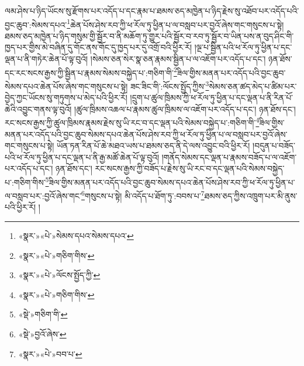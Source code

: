 ལམ་ཤེས་པ་ཉིད་ཡོངས་སུ་རྫོགས་པར་འདོད་པ་དང་རྣམ་པ་ཐམས་ཅད་མཁྱེན་པ་ཉིད་རྗེས་སུ་འཐོབ་པར་འདོད་པའི་བྱང་ཆུབ་:སེམས་དཔའ་\footnote{«སྣར་»«པེ་»སེམས་དཔའ་སེམས་དཔའ་}ཆེན་པོས་ཤེས་རབ་ཀྱི་ཕ་རོལ་ཏུ་ཕྱིན་པ་ལ་བསླབ་པར་བྱའོ་ཞེས་གང་གསུངས་པ་སྟེ། ཐམས་ཅད་མཁྱེན་པ་ཉིད་གསུམ་གྱི་སྦྱོར་བ་ནི་མཆོག་ཏུ་གྱུར་པའི་སྦྱོར་བ་རབ་ཏུ་སྦྱོར་བ་ཡིན་པས་ན་བུད་ཤིང་གི་ཁྱད་པར་གྱིས་མེ་བཞིན་དུ་གོང་ནས་གོང་དུ་ཁྱད་པར་དུ་འགྲོ་བའི་ཕྱིར་རོ། །ལྔ་པ་སྦྱིན་པའི་ཕ་རོལ་ཏུ་ཕྱིན་པ་དང་ལྡན་པ་ནི་གཏེར་ཆེན་པོ་ལྟ་བུའོ། །སེམས་ཅན་སེར་སྣ་ཅན་རྣམས་སྦྱིན་པ་ལ་འཇོག་པར་འདོད་པ་དང་། ཉན་ཐོས་དང་རང་སངས་རྒྱས་ཀྱི་སྦྱིན་པ་རྣམས་སེམས་བསྐྱེད་པ་:གཅིག་གི་\footnote{«སྣར་»«པེ་»གཅིག་གིས་}ཟིལ་གྱིས་མནན་པར་འདོད་པའི་བྱང་ཆུབ་སེམས་དཔའ་ཆེན་པོས་ཞེས་གང་གསུངས་པ་སྟེ། ཟང་ཟིང་གི་:ལོངས་སྤྱོད་ཀྱིས་\footnote{«སྣར་»«པེ་»ལོངས་སྤྱོད་ཀྱི་}སེམས་ཅན་ཚད་མེད་པ་ཚིམ་པར་བྱེད་ཀྱང་ཡོངས་སུ་གཏུགས་པ་མེད་པའི་ཕྱིར་རོ། །དྲུག་པ་ཚུལ་ཁྲིམས་ཀྱི་ཕ་རོལ་ཏུ་ཕྱིན་པ་དང་ལྡན་པ་ནི་རིན་པོ་ཆེའི་འབྱུང་གནས་ལྟ་བུའོ། །ཚུལ་ཁྲིམས་འཆལ་པ་རྣམས་ཚུལ་ཁྲིམས་ལ་འཇོག་པར་འདོད་པ་དང་། ཉན་ཐོས་དང་། རང་སངས་རྒྱས་ཀྱི་ཚུལ་ཁྲིམས་རྣམས་རྗེས་སུ་ཡི་རང་བ་དང་ལྡན་པའི་སེམས་བསྐྱེད་པ་:གཅིག་གི་\footnote{«སྣར་»«པེ་»གཅིག་གིས་}ཟིལ་གྱིས་མནན་པར་འདོད་པའི་བྱང་ཆུབ་སེམས་དཔའ་ཆེན་པོས་ཤེས་རབ་ཀྱི་ཕ་རོལ་ཏུ་ཕྱིན་པ་ལ་བསླབ་པར་བྱའོ་ཞེས་གང་གསུངས་པ་སྟེ། ཡོན་ཏན་རིན་པོ་ཆེ་མཐའ་ཡས་པ་ཐམས་ཅད་ནི་དེ་ལས་འབྱུང་བའི་ཕྱིར་རོ། །བདུན་པ་བཟོད་པའི་ཕ་རོལ་ཏུ་ཕྱིན་པ་དང་ལྡན་པ་ནི་རྒྱ་མཚོ་ཆེན་པོ་ལྟ་བུའོ། །གནོད་སེམས་དང་ལྡན་པ་རྣམས་བཟོད་པ་ལ་འཇོག་པར་འདོད་པ་དང་། ཉན་ཐོས་དང་། རང་སངས་རྒྱས་ཀྱི་བཟོད་པ་རྗེས་སུ་ཡི་རང་བ་དང་ལྡན་པའི་སེམས་བསྐྱེད་པ་:གཅིག་གིས་\footnote{«སྡེ་»གཅིག་གི་}ཟིལ་གྱིས་མནན་པར་འདོད་པའི་བྱང་ཆུབ་སེམས་དཔའ་ཆེན་པོས་ཤེས་རབ་ཀྱི་ཕ་རོལ་ཏུ་ཕྱིན་པ་ལ་བསླབ་པར་:བྱའོ་ཞེས་གང་\footnote{«སྡེ་»བྱའོ་ཞེས་}གསུངས་པ་སྟེ། མི་འདོད་པ་ཐོག་ཏུ་:བབས་པ་\footnote{«སྣར་»«པེ་»བབ་པ་}ཐམས་ཅད་ཀྱིས་འཁྲུག་པར་མི་ནུས་པའི་ཕྱིར་རོ། །
